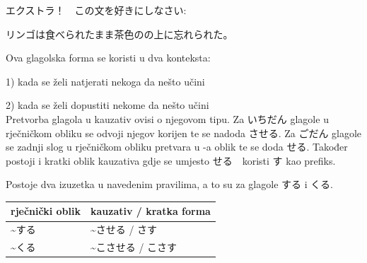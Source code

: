         \begin{mondai}{ エクストラ！　この文を好きにしなさい: }
        	\item リンゴは食べられたまま茶色のの上に忘れられた。 
        \end{mondai}
    
		
	
\newpage
{}

	
	Ova glagolska forma se koristi u dva konteksta:
	
	1) kada se želi natjerati nekoga da nešto učini
	
	2) kada se želi dopustiti nekome da nešto učini\\
	
	Pretvorba glagola u kauzativ ovisi o njegovom tipu.
	Za いちだん glagole u rječničkom obliku se odvoji njegov korijen te se nadoda させる.
	Za ごだん glagole se zadnji slog u rječničkom obliku pretvara u -a oblik te se doda せる.
	Također postoji i kratki oblik kauzativa gdje se umjesto せる　koristi す kao prefiks.
	
	\begin{reibun}
	\end{reibun}
	
	Postoje dva izuzetka u navedenim pravilima, a to su za glagole する i くる.
	
	\begin{table}[h]
		\centering
		\begin{tabular}{l l}\toprule[2pt]
			rječnički oblik & kauzativ / kratka forma\\
			\midrule
			\textasciitilde する　& \textasciitilde させる / さす\\
			\textasciitilde くる　&\textasciitilde こさせる / こさす\\
			\bottomrule[2pt]
		\end{tabular}
	\end{table}
	
	\newpage
	
		
